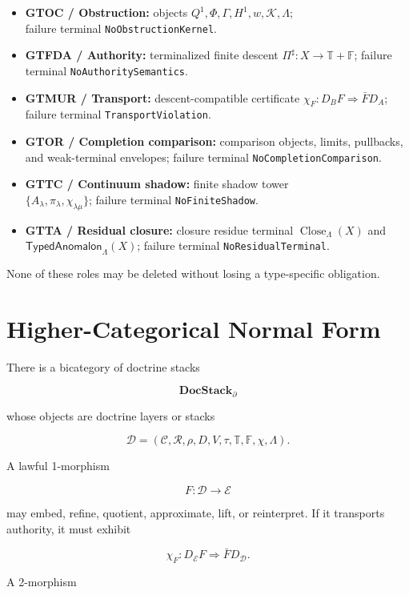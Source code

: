 \documentclass[11pt]{article}
\begin{document}
\begin{itemize}
    \item \textbf{GTOC / Obstruction:} objects \(Q^1,\Phi,\Gamma,H^1,w,\mathcal K,\Lambda\);\\
    failure terminal \texttt{NoObstructionKernel}.
    \item \textbf{GTFDA / Authority:} terminalized finite descent \(\Pi^\sharp:X\to\mathbb T+\mathbb F\); failure terminal \texttt{NoAuthoritySemantics}.
    \item \textbf{GTMUR / Transport:} descent-compatible certificate \(\chi_F:D_BF\Rightarrow\bar FD_A\); failure terminal \texttt{TransportViolation}.
    \item \textbf{GTOR / Completion comparison:} comparison objects, limits, pullbacks, and weak-terminal envelopes; failure terminal \texttt{NoCompletionComparison}.
    \item \textbf{GTTC / Continuum shadow:} finite shadow tower\\
    \(\{A_\lambda,\pi_\lambda,\chi_{\lambda\mu}\}\); failure terminal \texttt{NoFiniteShadow}.
    \item \textbf{GTTA / Residual closure:} closure residue terminal \(\operatorname{Close}_\Lambda(X)\) and \(\mathsf{TypedAnomalon}_\Lambda(X)\); failure terminal \texttt{NoResidualTerminal}.
\end{itemize}

None of these roles may be deleted without losing a type-specific obligation.

\section{Higher-Categorical Normal Form}

There is a bicategory of doctrine stacks

\[
\mathbf{DocStack}_{\partial}
\]

whose objects are doctrine layers or stacks

\[
\mathcal D
=
(
\mathcal C,
\mathcal R,
\rho,
D,
V,
\tau,
\mathbb T,
\mathbb F,
\chi,
\Lambda
).
\]

A lawful 1-morphism

\[
F:\mathcal D\to\mathcal E
\]

may embed, refine, quotient, approximate, lift, or reinterpret. If it transports authority, it must exhibit

\[
\boxed{
\chi_F:D_{\mathcal E}F\Rightarrow\bar F D_{\mathcal D}.
}
\]

A 2-morphism
\end{document}
